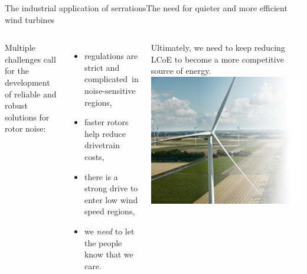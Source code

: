 \documentclass[xcolor=table,aspectratio=169]{beamer}
\begin{document}
\begin{frame}[b]{The industrial application of serrations}{The need for quieter and more efficient wind turbines}
    \begin{columns}
        \footnotesize{Multiple challenges call for the development of reliable and robust solutions for rotor noise:
            \begin{itemize}
                \item regulations are strict and complicated\footnotemark\ in noise-sensitive regions,
                \item faster rotors help reduce drivetrain costs,
                \item there is a strong drive to enter low wind speed regions,
                \item we \emph{need} to let the people know that we care.
            \end{itemize}
        }

        \vspace{5mm}
        Ultimately, we need to keep reducing LCoE to become a more competitive source of energy.
        \vspace{5mm}
        \includegraphics[width=\textwidth]{media/LM_holland_helikopter_modified.jpg}
        \vspace{6mm}
    \end{columns}
\end{frame}
\end{document}
